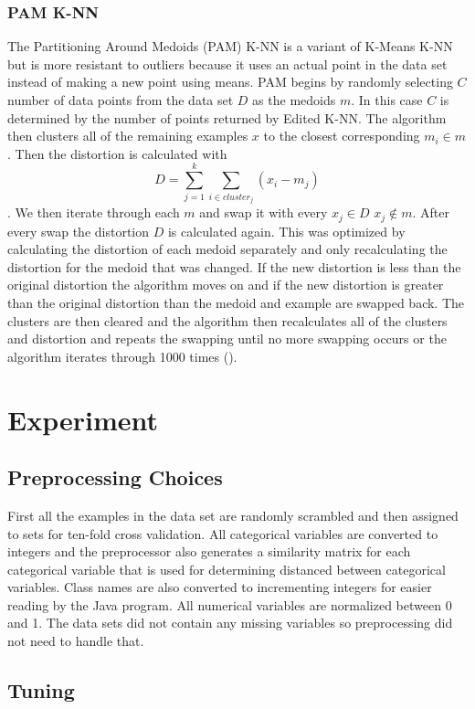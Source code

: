 \documentclass[twoside,11pt]{article}
\begin{document}
\subsubsection{PAM K-NN}
The Partitioning Around Medoids (PAM) K-NN is a variant of K-Means K-NN but is more resistant to outliers because it uses an actual point in the data set instead of making a new point using means. PAM begins by randomly selecting $C$ number of data points from the data set $D$ as the medoids $m$. In this case $C$ is determined by the number of points returned by Edited K-NN. The algorithm then clusters all of the remaining examples $x$ to the closest corresponding $m_i \in m$. Then the distortion is calculated with $$D = \sum_{j=1}^{k}\sum_{i \in cluster_j} (x_i - m_j)$$. We then iterate through each $m$ and swap it with every $x_j \in D$ $x_j \notin m$. After every swap the distortion $D$ is calculated again. This was optimized by calculating the distortion of each medoid separately and only recalculating the distortion for the medoid that was changed. If the new distortion is less than the original distortion the algorithm moves on and if the new distortion is greater than the original distortion than the medoid and example are swapped back. The clusters are then cleared and the algorithm then recalculates all of the clusters and distortion and repeats the swapping until no more swapping occurs or the algorithm iterates through 1000 times (\cite{Fox1990FindingGI}).

\section{Experiment}

\subsection{Preprocessing Choices}

First all the examples in the data set are randomly scrambled and then assigned to sets for ten-fold cross validation. All categorical variables are converted to integers and the preprocessor also generates a similarity matrix for each categorical variable that is used for determining distanced between categorical variables. Class names are also converted to incrementing integers for easier reading by the Java program. All numerical variables are normalized between 0 and 1. The data sets did not contain any missing variables so preprocessing did not need to handle that. 

\subsection{Tuning}
\end{document}
